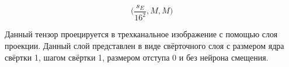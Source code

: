\documentclass[times,specification,annotation]{itmo-student-thesis}
\begin{document}
$$
\Big(\dfrac{s_E}{16^2},  M, M\Big)
$$

Данный тензор проецируется в трехканальное изображение с помощью слоя проекции. Данный слой представлен в виде свёрточного слоя с размером ядра свёртки 1, шагом свёртки 1, размером отступа 0 и без нейрона смещения.






\end{document}

